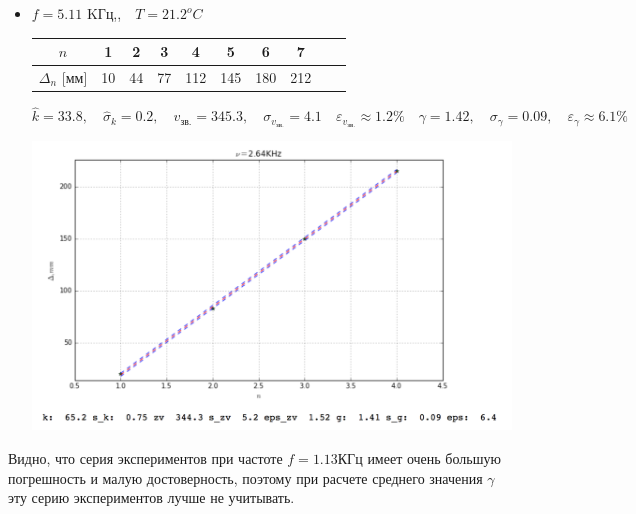 \documentclass[10pt]{article}
\begin{document}
\begin{enumerate}
\begin{itemize}
        \item $f = 5.11$ KГц,,$ \quad T = 21.2^o C$

        \begin{center}
                    \begin{tabular}{|c|c|c|c|c|c|c|c|c|c|}
                            \hline 
                                $n$ & 1 & 2 & 3 & 4 & 5 & 6 & 7 \\
                            \hline
                                $\Delta_n$ [мм]& 10&44&77&112&145&180&212\\
                            \hline
                    \end{tabular}
        \end{center}

        \begin{equation}
            \hat{k} = 33.8 ,\quad \hat{\sigma}_k = 0.2, \quad v_\text{зв.} = 345.3, \quad \sigma_{v_\text{зв.}} = 4.1 \quad \varepsilon_{v_\text{зв.}} \approx 1.2\% \quad \gamma = 1.42, \quad \sigma_\gamma = 0.09, \quad \varepsilon_\gamma \approx 6.1\%
        \end{equation}

        \begin{center} 
            \includegraphics[width=5in]{2ex.png}
        \end{center}

    \end{itemize}

    \end{enumerate}

    Видно, что серия экспериментов при частоте $f = 1.13\text{КГц}$ имеет очень большую погрешность и малую достоверность, поэтому при расчете среднего значения $\gamma$ эту серию экспериментов лучше не учитывать.
\end{document}
